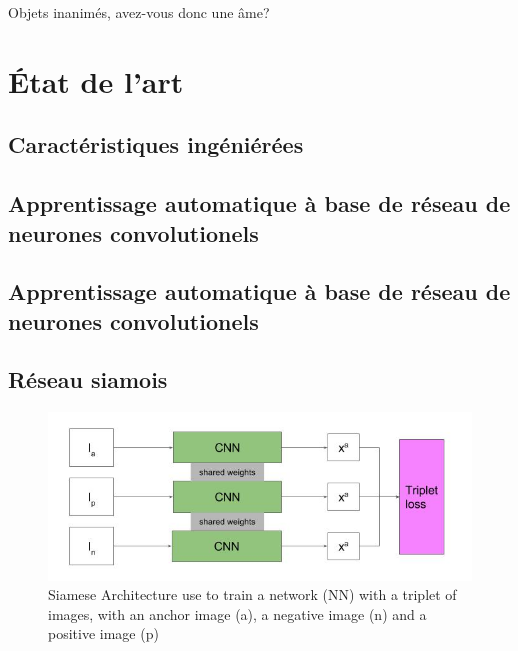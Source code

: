 \begin{savequote}[75mm] 
Objets inanimés, avez-vous donc une âme?
\end{savequote}

\chapter{État de l'art}
\label{chap:stateoftheart}

\section{Caractéristiques ingéniérées}
\label{sec:stateoftheartingenierees}


\section{Apprentissage automatique à base de réseau de neurones convolutionels}
\label{sec:stateoftheartNN}


\section{Apprentissage automatique à base de réseau de neurones convolutionels}
\label{sec:stateoftheartNN}

\section{Réseau siamois}
\label{sec:stateoftheartsiamois}





\begin{figure}
	\centering
    \includegraphics[width=\linewidth]{figures/3way_siamese__1_.jpg}
    \caption{Siamese Architecture use to train a network (NN) with a triplet of images, with an anchor image (a), a negative image (n) and a positive image (p)
    \label{fig:tripletloss}}
\end{figure}




